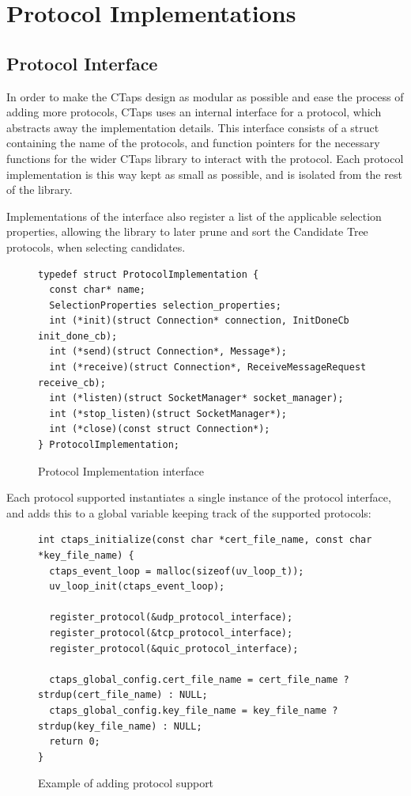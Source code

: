 \section{Protocol Implementations}

\subsection{Protocol Interface}
In order to make the CTaps design as modular as possible and ease the
process of adding more protocols, CTaps uses an internal interface for a protocol,
which abstracts away the implementation details. This interface consists of
a struct containing the name of the protocols, and function pointers for
the necessary functions for the wider CTaps library to interact with the protocol.
Each protocol implementation is this way kept as small as possible, and is
isolated from the rest of the library.

Implementations of the interface also register
a list of the applicable selection properties, allowing the library
to later prune and sort the Candidate Tree protocols, when selecting
candidates.

\begin{figure}[H]
\begin{verbatim}
typedef struct ProtocolImplementation {
  const char* name;
  SelectionProperties selection_properties;
  int (*init)(struct Connection* connection, InitDoneCb init_done_cb);
  int (*send)(struct Connection*, Message*);
  int (*receive)(struct Connection*, ReceiveMessageRequest receive_cb);
  int (*listen)(struct SocketManager* socket_manager);
  int (*stop_listen)(struct SocketManager*);
  int (*close)(const struct Connection*);
} ProtocolImplementation;
\end{verbatim}
\caption{Protocol Implementation interface}
\end{figure} 

Each protocol supported instantiates a single instance of the
protocol interface, and adds this to a global variable keeping
track of the supported protocols: 

\begin{figure}[H]
  \begin{verbatim}
int ctaps_initialize(const char *cert_file_name, const char *key_file_name) {
  ctaps_event_loop = malloc(sizeof(uv_loop_t));
  uv_loop_init(ctaps_event_loop);

  register_protocol(&udp_protocol_interface);
  register_protocol(&tcp_protocol_interface);
  register_protocol(&quic_protocol_interface);

  ctaps_global_config.cert_file_name = cert_file_name ? strdup(cert_file_name) : NULL;
  ctaps_global_config.key_file_name = key_file_name ? strdup(key_file_name) : NULL;
  return 0;
}
  \end{verbatim}
  \caption{Example of adding protocol support}
\end{figure}

